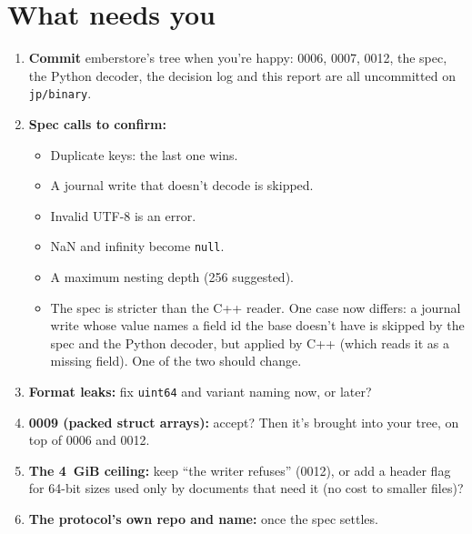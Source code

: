 \documentclass[11pt,a4paper]{article}
\newcommand{\code}[1]{\texttt{#1}}
\begin{document}
\section{What needs you}\label{sec:needs-you}
\begin{enumerate}
  \item \textbf{Commit} emberstore's tree when you're happy: 0006, 0007, 0012, the spec, the Python decoder, the decision log and this report are all uncommitted on \code{jp/binary}.
  \item \textbf{Spec calls to confirm:}
    \begin{itemize}
      \item Duplicate keys: the last one wins.
      \item A journal write that doesn't decode is skipped.
      \item Invalid UTF-8 is an error.
      \item NaN and infinity become \code{null}.
      \item A maximum nesting depth (256 suggested).
      \item The spec is stricter than the C++ reader. One case now differs: a journal write whose value names a field id the base doesn't have is skipped by the spec and the Python decoder, but applied by C++ (which reads it as a missing field). One of the two should change.
    \end{itemize}
  \item \textbf{Format leaks:} fix \code{uint64} and variant naming now, or later?
  \item \textbf{0009 (packed struct arrays):} accept? Then it's brought into your tree, on top of 0006 and 0012.
  \item \textbf{The 4~GiB ceiling:} keep ``the writer refuses'' (0012), or add a header flag for 64-bit sizes used only by documents that need it (no cost to smaller files)?
  \item \textbf{The protocol's own repo and name:} once the spec settles.
\end{enumerate}
\end{document}
